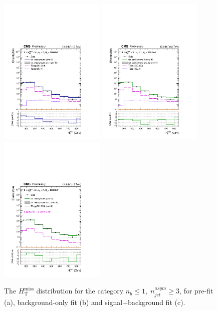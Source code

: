 \clearpage
\begin{figure}[tbhp]
    \caption{ 
    The $H_{\mathrm{T}}^{\mathrm{miss}}$ distribution for the category $n_{b}\leq 1, \; n_{jet}^{asym} \geq 3$, for pre-fit (a), background-only fit (b) and signal+background fit (c).
    \label{fig:mhtShape_le1b_ge3a} }
  \begin{center}
  \includegraphics[width=0.45\textwidth]{mhtShape_le1b_ge3a_200_Inf_prefit_aux} \hspace{1cm}
  \includegraphics[width=0.45\textwidth]{mhtShape_le1b_ge3a_200_Inf_fit_b_aux} \\
  \includegraphics[width=0.45\textwidth]{mhtShape_le1b_ge3a_200_Inf_fit_s_aux}
  \end{center}
\end{figure}


